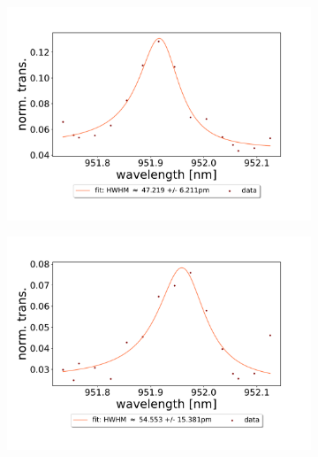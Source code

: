 \begin{figure}[h!] \ContinuedFloat
    \centering
    \begin{subfigure}[b]{0.49\textwidth}
        \includegraphics[width=\textwidth]{figures/results/double fano fits/20250326/33um_M3:M5_fit_7.pdf}
        \caption{}
        \label{fig:33um_M3:M5_fit_7}
    \end{subfigure}
    \begin{subfigure}[b]{0.49\textwidth}
        \includegraphics[width=\textwidth]{figures/results/double fano fits/20250326/33um_M3:M5_fit_8.pdf}
        \caption{}
        \label{fig:33um_M3:M5_fit_8}
    \end{subfigure}
    \begin{subfigure}[b]{0.49\textwidth}

\end{subfigure}
\end{figure}
